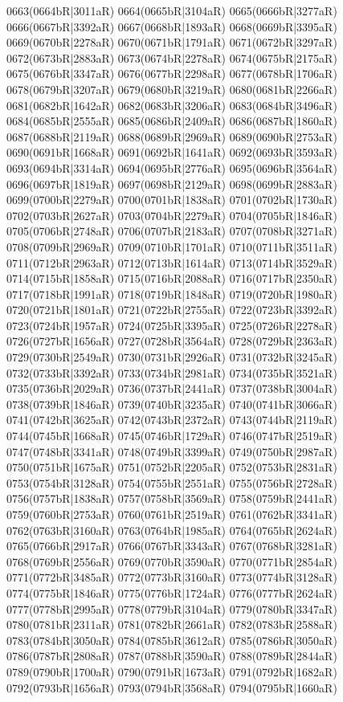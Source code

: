 0663(0664bR|3011aR) 0664(0665bR|3104aR) 0665(0666bR|3277aR) \\0666(0667bR|3392aR) 0667(0668bR|1893aR) 0668(0669bR|3395aR) 0669(0670bR|2278aR) 0670(0671bR|1791aR) 0671(0672bR|3297aR) 0672(0673bR|2883aR) 0673(0674bR|2278aR) 0674(0675bR|2175aR) \\0675(0676bR|3347aR) 0676(0677bR|2298aR) 0677(0678bR|1706aR) 0678(0679bR|3207aR) 0679(0680bR|3219aR) 0680(0681bR|2266aR) 0681(0682bR|1642aR) 0682(0683bR|3206aR) 0683(0684bR|3496aR) \\0684(0685bR|2555aR) 0685(0686bR|2409aR) 0686(0687bR|1860aR) 0687(0688bR|2119aR) 0688(0689bR|2969aR) 0689(0690bR|2753aR) 0690(0691bR|1668aR) 0691(0692bR|1641aR) 0692(0693bR|3593aR) \\0693(0694bR|3314aR) 0694(0695bR|2776aR) 0695(0696bR|3564aR) 0696(0697bR|1819aR) 0697(0698bR|2129aR) 0698(0699bR|2883aR) 0699(0700bR|2279aR) 0700(0701bR|1838aR) 0701(0702bR|1730aR) \\0702(0703bR|2627aR) 0703(0704bR|2279aR) 0704(0705bR|1846aR) 0705(0706bR|2748aR) 0706(0707bR|2183aR) 0707(0708bR|3271aR) 0708(0709bR|2969aR) 0709(0710bR|1701aR) 0710(0711bR|3511aR) \\0711(0712bR|2963aR) 0712(0713bR|1614aR) 0713(0714bR|3529aR) 0714(0715bR|1858aR) 0715(0716bR|2088aR) 0716(0717bR|2350aR) 0717(0718bR|1991aR) 0718(0719bR|1848aR) 0719(0720bR|1980aR) \\0720(0721bR|1801aR) 0721(0722bR|2755aR) 0722(0723bR|3392aR) 0723(0724bR|1957aR) 0724(0725bR|3395aR) 0725(0726bR|2278aR) 0726(0727bR|1656aR) 0727(0728bR|3564aR) 0728(0729bR|2363aR) \\0729(0730bR|2549aR) 0730(0731bR|2926aR) 0731(0732bR|3245aR) 0732(0733bR|3392aR) 0733(0734bR|2981aR) 0734(0735bR|3521aR) 0735(0736bR|2029aR) 0736(0737bR|2441aR) 0737(0738bR|3004aR) \\0738(0739bR|1846aR) 0739(0740bR|3235aR) 0740(0741bR|3066aR) 0741(0742bR|3625aR) 0742(0743bR|2372aR) 0743(0744bR|2119aR) 0744(0745bR|1668aR) 0745(0746bR|1729aR) 0746(0747bR|2519aR) \\0747(0748bR|3341aR) 0748(0749bR|3399aR) 0749(0750bR|2987aR) 0750(0751bR|1675aR) 0751(0752bR|2205aR) 0752(0753bR|2831aR) 0753(0754bR|3128aR) 0754(0755bR|2551aR) 0755(0756bR|2728aR) \\0756(0757bR|1838aR) 0757(0758bR|3569aR) 0758(0759bR|2441aR) 0759(0760bR|2753aR) 0760(0761bR|2519aR) 0761(0762bR|3341aR) 0762(0763bR|3160aR) 0763(0764bR|1985aR) 0764(0765bR|2624aR) \\0765(0766bR|2917aR) 0766(0767bR|3343aR) 0767(0768bR|3281aR) 0768(0769bR|2556aR) 0769(0770bR|3590aR) 0770(0771bR|2854aR) 0771(0772bR|3485aR) 0772(0773bR|3160aR) 0773(0774bR|3128aR) \\0774(0775bR|1846aR) 0775(0776bR|1724aR) 0776(0777bR|2624aR) 0777(0778bR|2995aR) 0778(0779bR|3104aR) 0779(0780bR|3347aR) 0780(0781bR|2311aR) 0781(0782bR|2661aR) 0782(0783bR|2588aR) \\0783(0784bR|3050aR) 0784(0785bR|3612aR) 0785(0786bR|3050aR) 0786(0787bR|2808aR) 0787(0788bR|3590aR) 0788(0789bR|2844aR) 0789(0790bR|1700aR) 0790(0791bR|1673aR) 0791(0792bR|1682aR) \\0792(0793bR|1656aR) 0793(0794bR|3568aR) 0794(0795bR|1660aR) 